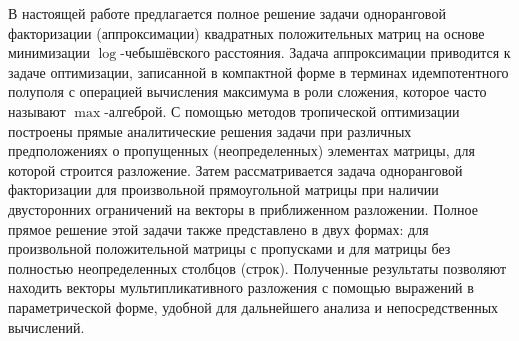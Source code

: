 \documentclass[specialist,
               substylefile = spbu.rtx,
               subf,href,colorlinks=true, 12pt]{disser}
\theoremstyle{definition}
\begin{document}
В настоящей работе предлагается полное решение задачи одноранговой факторизации (аппроксимации) квадратных положительных матриц  на основе минимизации $\log$-че\-бы\-шёвского расстояния. Задача аппроксимации приводится к задаче оптимизации, записанной в компактной форме в терминах идемпотентного полуполя с операцией вычисления максимума в роли сложения, которое часто называют $\max$-алгеброй. %
 С помощью методов тропической оптимизации \cite{Krivulin2014Constrained,Krivulin2014Tropical,Krivulin2015Extremal,Krivulin2015Multidimensional}
построены прямые аналитические решения задачи при различных предположениях о
пропущенных (неопределенных) элементах матрицы, для которой строится разложение. 
Затем рассматривается задача одноранговой факторизации для произвольной прямоугольной матрицы при наличии двусторонних ограничений на векторы
в приближенном разложении. 
 Полное прямое решение этой задачи также представлено в двух формах: для произвольной положительной матрицы с пропусками и для матрицы без полностью неопределенных столбцов (строк). 
Полученные результаты позволяют находить векторы мультипликативного разложения с помощью выражений в параметрической форме, удобной для дальнейшего анализа и непосредственных вычислений.

\end{document}
